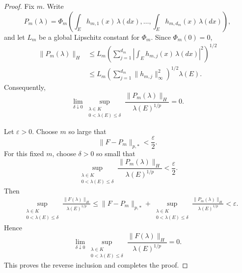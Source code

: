 \documentclass[10pt,a4paper]{amsart}
\begin{document}
\begin{proof}
Fix \(m\). Write
\[
P_m(\lambda)
=
\Phi_m
\left(
        \int_E h_{m,1}(x)\,\lambda(dx),
        \ldots,
        \int_E h_{m,d_m}(x)\,\lambda(dx)
\right),
\]
and let \(L_m\) be a global Lipschitz constant for \(\Phi_m\).
Since \(\Phi_m(0)=0\),
\[
\begin{aligned}
\lVert P_m(\lambda)\rVert_H
&\le
L_m
\left(
\sum_{j=1}^{d_m}
\left|
\int_Eh_{m,j}(x)\,\lambda(dx)
\right|^2
\right)^{1/2}
\\
&\le
L_m
\left(
\sum_{j=1}^{d_m}
\lVert h_{m,j}\rVert_\infty^2
\right)^{1/2}
\lambda(E).
\end{aligned}
\]
Consequently,
\[
\lim_{\delta\downarrow0}
\sup_{\substack{\lambda\in K\\
                 0<\lambda(E)\le\delta}}
\frac{\lVert P_m(\lambda)\rVert_H}
     {\lambda(E)^{1/p}}
=
0.
\]

Let \(\varepsilon>0\). Choose \(m\) so large that
\[
        \lVert F-P_m\rVert_{p,*}
        <
        \frac{\varepsilon}{2}.
\]
For this fixed \(m\), choose \(\delta>0\) so small that
\[
\sup_{\substack{\lambda\in K\\
                 0<\lambda(E)\le\delta}}
\frac{\lVert P_m(\lambda)\rVert_H}
     {\lambda(E)^{1/p}}
<
\frac{\varepsilon}{2}.
\]
Then
\[
\begin{aligned}
&
\sup_{\substack{\lambda\in K\\
                 0<\lambda(E)\le\delta}}
\frac{\lVert F(\lambda)\rVert_H}
     {\lambda(E)^{1/p}}
\le
\lVert F-P_m\rVert_{p,*}
+
\sup_{\substack{\lambda\in K\\
                 0<\lambda(E)\le\delta}}
\frac{\lVert P_m(\lambda)\rVert_H}
     {\lambda(E)^{1/p}}
<
\varepsilon.
\end{aligned}
\]
Hence
\[
\lim_{\delta\downarrow0}
\sup_{\substack{\lambda\in K\\
                 0<\lambda(E)\le\delta}}
\frac{\lVert F(\lambda)\rVert_H}
     {\lambda(E)^{1/p}}
=
0.
\]
This proves the reverse inclusion and completes the proof.
\end{proof}
\end{document}
